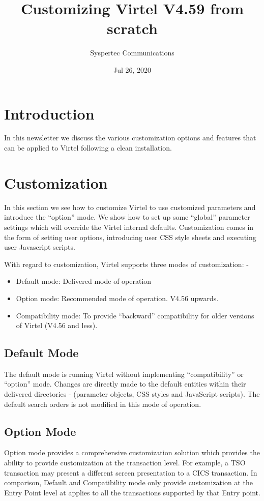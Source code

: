 \documentclass[letterpaper,10pt,english]{sphinxmanual}
\title{Customizing Virtel V4.59 from scratch}
\date{Jul 26, 2020}
\author{Syspertec Communications}
\begin{document}
\pagestyle{empty}
\sphinxmaketitle
\pagestyle{plain}
\sphinxtableofcontents
\pagestyle{normal}
\label{\detokenize{TN202002::doc}}



\chapter{Introduction}
\label{\detokenize{TN202002:introduction}}
In this newsletter we discuss the various customization options and features that can be applied to Virtel following a clean installation.


\chapter{Customization}
\label{\detokenize{TN202002:customization}}
In this section we see how to customize Virtel to use customized parameters and introduce the “option” mode. We show how to set up some “global” parameter settings which will override the Virtel internal defaults. Customization comes in the form of setting user options, introducing user CSS style sheets and executing user Javascript scripts.

With regard to customization, Virtel supports three modes of customization: -
\begin{itemize}
\item {} 
Default mode:      Delivered mode of operation

\item {} 
Option mode:       Recommended mode of operation. V4.56 upwards.

\item {} 
Compatibility mode:  To provide “backward” compatibility for older versions of Virtel (V4.56 and less).

\end{itemize}


\section{Default Mode}
\label{\detokenize{TN202002:default-mode}}
The default mode is running Virtel without implementing “compatibility” or “option” mode. Changes are directly made to the default entities within their delivered directories - (parameter objects, CSS styles and JavaScript scripts). The default search orders is not modified in this mode of operation.


\section{Option Mode}
\label{\detokenize{TN202002:option-mode}}
Option mode provides a comprehensive customization solution which provides the ability to provide customization at the transaction level. For example, a TSO transaction may present a different screen presentation to a CICS transaction. In comparison, Default and Compatibility mode only provide customization at the Entry Point level at applies to all the transactions supported by that Entry point.
\end{document}
